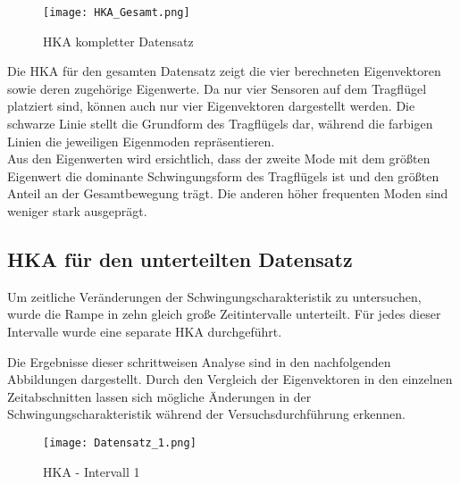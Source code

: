         \begin{figure}[H]
            \centering
            \texttt{[image: HKA\_Gesamt.png]}
            \caption{HKA kompletter Datensatz}
            \label{fig: HKA gesmat}
        \end{figure}

        \noindent
        Die HKA für den gesamten Datensatz zeigt die vier berechneten Eigenvektoren sowie deren 
        zugehörige Eigenwerte. Da nur vier Sensoren auf dem Tragflügel platziert sind, können 
        auch nur vier Eigenvektoren dargestellt werden. Die schwarze Linie stellt die Grundform 
        des Tragflügels dar, während die farbigen Linien die jeweiligen Eigenmoden repräsentieren.
        \\

        \noindent
        Aus den Eigenwerten wird ersichtlich, dass der zweite Mode mit dem größten Eigenwert 
        die dominante Schwingungsform des Tragflügels ist und den größten Anteil an der 
        Gesamtbewegung trägt. Die anderen höher frequenten Moden sind weniger stark ausgeprägt.
    \subsection{HKA für den unterteilten Datensatz}
        Um zeitliche Veränderungen der Schwingungscharakteristik zu untersuchen, wurde die Rampe 
        in zehn gleich große Zeitintervalle unterteilt. Für jedes dieser Intervalle wurde eine 
        separate HKA durchgeführt. 

        \noindent
        Die Ergebnisse dieser schrittweisen Analyse sind in den nachfolgenden Abbildungen dargestellt. 
        Durch den Vergleich der Eigenvektoren in den einzelnen Zeitabschnitten lassen sich mögliche 
        Änderungen in der Schwingungscharakteristik während der Versuchsdurchführung erkennen.

        \begin{figure}[H]
            \centering
            \texttt{[image: Datensatz\_1.png]}
            \caption{HKA - Intervall 1}
            \label{fig: HKA_intervall_1}
        \end{figure}

